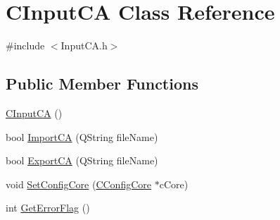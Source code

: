 \hypertarget{classCInputCA}{
\section{CInputCA Class Reference}
\label{classCInputCA}
}


{\ttfamily \#include $<$InputCA.h$>$}\subsection*{Public Member Functions}
\begin{DoxyCompactItemize}
\item 
\hyperlink{classCInputCA_a8903f80fae371eeb71be05a80be11f8b}{CInputCA} ()
\item 
bool \hyperlink{classCInputCA_a42d417afadc4ff816c0555dc41e101bb}{ImportCA} (QString fileName)
\item 
bool \hyperlink{classCInputCA_a11c14c3a7eebd8513152cec4aeaee10d}{ExportCA} (QString fileName)
\item 
void \hyperlink{classCInputCA_ad951b8c0fedc1570d3155034c9bf0d89}{SetConfigCore} (\hyperlink{classCConfigCore}{CConfigCore} $\ast$cCore)
\item 
int \hyperlink{classCInputCA_a87c0ff3d984b033bbd1580b3fd6e4dff}{GetErrorFlag} ()
\end{DoxyCompactItemize}
